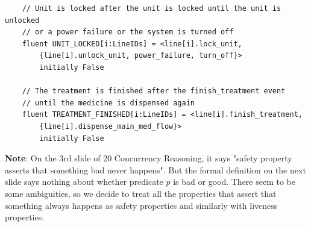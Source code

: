 \documentclass[titlepage]{article}
\begin{document}
\begin{verbatim}
    // Unit is locked after the unit is locked until the unit is unlocked
    // or a power failure or the system is turned off
    fluent UNIT_LOCKED[i:LineIDs] = <line[i].lock_unit, 
        {line[i].unlock_unit, power_failure, turn_off}>
        initially False
    
    // The treatment is finished after the finish_treatment event 
    // until the medicine is dispensed again
    fluent TREATMENT_FINISHED[i:LineIDs] = <line[i].finish_treatment,
        {line[i].dispense_main_med_flow}>
        initially False
\end{verbatim}

\textbf{Note}: On the 3rd slide of 20 Concurrency Reasoning, it says "safety property asserts that something bad never happens". But the formal definition on the next slide says nothing about whether predicate $p$ is bad or good. There seem to be some ambiguities, so we decide to treat all the properties that assert that something always happens as safety properties and similarly with liveness properties.
\end{document}
